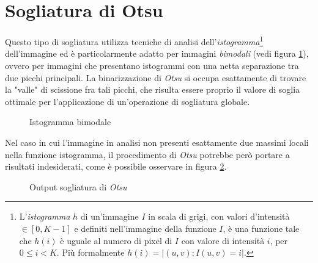 \section{Sogliatura di Otsu}
\label{sec:image-bin-otsu}
Questo tipo di sogliatura utilizza tecniche di analisi dell'\textit{istogramma}\footnote{L'\textit{istogramma} $h$ di un'immagine $I$ in scala di grigi, con valori d'intensit\`a $\in [0, K - 1]$ e definiti nell'immagine della funzione $I$,  \`e una funzione tale che $h(i)$ \`e uguale al numero di pixel di $I$ con valore di intensit\`a $i$, per $0 \leq i < K$. Pi\`u formalmente $h(i)=|{(u, v)\colon I(u, v)=i}|$.} dell'immagine ed \`e particolarmente adatto per immagini \textit{bimodali} (vedi figura \ref{fig:bimodal-hist}), ovvero per immagini che presentano istogrammi con una netta separazione tra due picchi principali. La binarizzazione di \textit{Otsu} si occupa esattamente di trovare la "valle" di scissione fra tali picchi, che risulta essere proprio il valore di soglia ottimale per l'applicazione di un'operazione di sogliatura globale.\par
\pgfplotsset{compat=1.16,width=13cm,height=7cm}
\begin{figure}[t]
	\centering
	\caption{Istogramma bimodale} \label{fig:bimodal-hist}
\end{figure}
Nel caso in cui l'immagine in analisi non presenti esattamente due massimi locali nella funzione istogramma, il procedimento di \textit{Otsu} potrebbe per\`o portare a risultati indesiderati, come \`e possibile osservare in figura \ref{fig:image-bin-otsu}.
\begin{figure}[H]
	\centering
	\caption{Output sogliatura di \textit{Otsu}}
	\label{fig:image-bin-otsu}
\end{figure}

